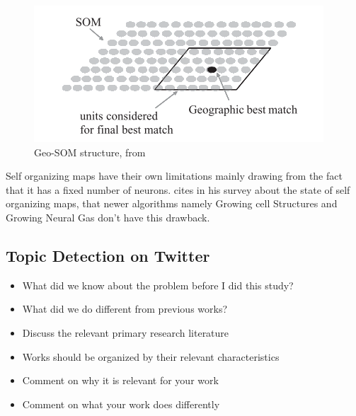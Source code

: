 \begin{figure}[tb]
  \begin{center}
    \includegraphics[]{images/6_geo-som.png}
  \end{center}
  \caption{Geo-SOM structure, from \citet{Bacao2005}}
  \label{fig:geo_som}
\end{figure}


Self organizing maps have their own limitations mainly drawing from the fact that it has a fixed number of neurons. \citet{Qiang2010} cites in his survey about the state of self organizing maps, that newer algorithms namely Growing cell Structures \cite{Fritzke1995} and Growing Neural Gas \cite{Fritzke1994} don't have this drawback.



\subsection{Topic Detection on Twitter} %
\label{sub:topic_detection_on_twitter}


\begin{itemize}
  \item What did we know about the problem before I did this study? 
  \item What did we do different from previous works? 
  \item Discuss the relevant primary research literature 
  \item Works should be organized by their relevant characteristics 
  \item Comment on why it is relevant for your work 
  \item Comment on what your work does differently 
\end{itemize}